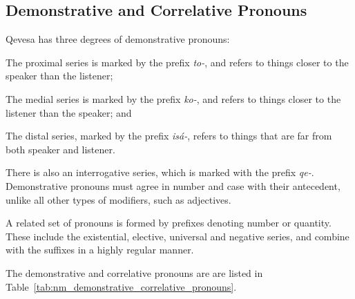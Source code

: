 \documentclass[grammar]{subfiles}
\begin{document}

  \subsection{Demonstrative and Correlative Pronouns}
  \label{ssec:nm_demonstrative_pronouns}

  Qevesa has three degrees of demonstrative pronouns:

  \begin{description}[style=nextline]
    \item[Proximal] The proximal series is marked by the prefix \textit{to-}, and refers to things closer to the speaker than the listener;
    \item[Medial] The medial series is marked by the prefix \textit{ko-}, and refers to things closer to the listener than the speaker; and
    \item[Distal] The distal series, marked by the prefix \textit{isá-}, refers to things that are far from both speaker and listener.
  \end{description}

  There is also an interrogative series, which is marked with the prefix \textit{qe-}. Demonstrative pronouns must agree in number and case with their antecedent, unlike all other types of modifiers, such as adjectives. 

  A related set of pronouns is formed by prefixes denoting number or quantity. These include the existential, elective, universal and negative series, and combine with the suffixes in a highly regular manner. 

  The demonstrative and correlative pronouns are are listed in Table~\ref{tab:nm_demonstrative_correlative_pronouns}.
\end{document}
